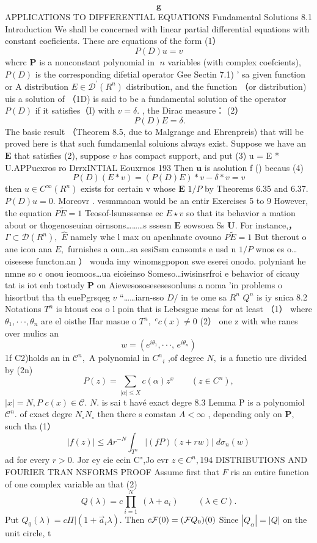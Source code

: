 $$ \hat{\boldsymbol{g}} $$ APPLICATIONS TO DIFFERENTIAL EQUATIONS Fundamental Solutions 8.1 Introduction We shall be concerned with linear partial differential equations with constant coeficients. These are equations of the form (1） $$ P(D)u=v $$ whcrc ${\boldsymbol{P}}$ is a nonconstant polynomial in $\;n$ variables (with complex coefcients), $\scriptstyle{P(D)}$ is the corresponding difetial operator Gee Sectin 7.1) ' sa given function or A distribution $E\in{\mathcal{D}}^{\prime}(R^{n})$ distribution, and the function （or distribution) uis a solution of （1D) is said to be a fundamental solution of the operator $\scriptstyle{P(D)}$ if it satisfies（I) with $v=\delta.$ , the Dirac measure： (2） $$ \ P(D)E=\delta. $$ The basic result （Theorem 8.5, due to Malgrange and Ehrenpreis) that will be proved here is that such fumdamenlal soluions always exist. Suppose we have an ${\boldsymbol{E}}$ that satisfies (2), suppose $\boldsymbol{\mathit{v}}$ has compact support, and put (3) u = E * U.APPucxros ro DrrxINTIAL Eouxrnos 193 Then ${\boldsymbol{u}}$ is asolution f () becaus (4) $$ P(D)(E*v)=(P(D)E)*v-\delta*v=v $$ then $u\in C^{\infty}(R^{n})$ exists for certain v whose ${\boldsymbol{E}}$ $1/P$ by Theorems 6.35 and 6.37. $P(D)u=0.$ Moreovr . vesmmaoan would be an entir Exercises 5 to 9 However, the equation $P{\tilde{E}}=1$ Teosof-lsunsssense ec $E\star v$ so that its behavior a mation about or thogenoseuian oirnsons………s sssesn $\boldsymbol{E}$ eowsoea Ss ${\boldsymbol{U}}.$ For instance,， $\Gamma\subset{\mathcal{D}}(R^{n}),$ $\hat{E}$ namely whe l max ou apenhnatc ovouno $P{\tilde{E}}=1$ But therout o ane icon ana $E,$ furnishes a oun…sa sesiSsm cansomts e usd n $1/P$ wnos es o…oisesese functon.an ） wouda imy winomsgpopon swe eserei onodo. polyniant he nmne so c onou ieomoos…ua eioieinso Someso…iwisinsrfroi e behavior of cicauy tat is iot enh tostudy $\boldsymbol{P}$ on Aiewesososesesesonluns a noma 'in problems o hisortbut tha th euePgrsqeg $\boldsymbol{\mathit{v}}$ “……iarn-sso $D\!\!\!\!/$ in te ome sa $\textstyle R^{n}$ $Q^{n}$ is iy snica 8.2 Notations $T^{\mathit{n}}$ is htoust cos o l poin that is Lebesgue meas for at least （1） where $\theta_{1},\cdot\cdot\cdot,\theta_{n}$ are el oisthe Har masue o $T^{n},$ ${}^{c}c(x)\neq0$ (2） one z with whe ranes over mulics an $$ w=(e^{i\theta_{1}},\cdot\cdot\cdot,\,e^{i\theta_{n}}) $$ 1f C2)holds an in ${\mathcal{C}}^{n},$ A polynomial in $C^{n}{}_{i}$ ,of degree $N,$ is a functio ure divided by (2n) $$ P(z)=\sum_{|\alpha|\le X}c(\alpha)z^{x}\qquad(z\in C^{n}), $$ $|x|=N,P$ $c(x)\in{\mathcal{C}}.$ $N.$ is sai t havé exact degre 8.3 Lemma P is a polynomiol ${\mathcal{C}}^{n}.$ of cxact degre $N_{\circ}N_{\circ}$ then there s comstan $A<\infty$ , depending only on ${\boldsymbol{P}},$ such tha (1） $$ |f(z)|\leq A r^{-N}{\int}_{T^{n}}|(f P)(z+r w)|\;d\sigma_{n}(w) $$ ad for every $r>0.$ Jor ey eie eein C",Jo evr $z\in C^{n},$194 DISTRIBUTIONS AND FOURIER TRAN NSFORMS PROOF Assume first that ${\mathbf{}}F$ ris an entire function of one complex variable an that (2) $$ Q(\lambda)=c\prod_{i=1}^{N}\;(\lambda+a_{i})\;\;\;\;\;\;\;\;(\lambda\in C). $$ Put $Q_{0}(\lambda)=c\Pi|(1+\vec{a}_{i}\lambda).$ Then $c{\cal F}(0)=({\cal F}Q_{0})(0)$ Since $|Q_{\alpha}|=|Q|$ on the unit circle, t 